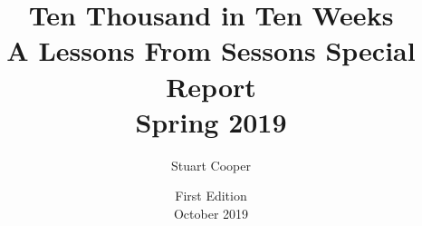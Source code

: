 \documentclass{book}
\begin{document}



\title{Ten Thousand in Ten Weeks\\
  A Lessons From Sessons Special Report\\
  Spring 2019
}
\author{Stuart Cooper}
\date{First Edition\\October 2019}

\end{document}

